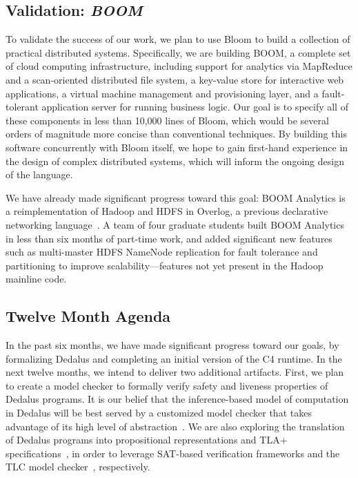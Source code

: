 \subsection{Validation: \emph{BOOM}}
To validate the success of our work, we plan to use Bloom
to build a collection of practical distributed systems. Specifically,
we are building BOOM, a complete set of cloud computing
infrastructure, including support for analytics via MapReduce and a
scan-oriented distributed file system, a key-value store for
interactive web applications, a virtual machine management and
provisioning layer, and a fault-tolerant application server for
running business logic. Our goal is to specify all of these components
in less than 10,000 lines of Bloom, which would be several orders of
magnitude more concise than conventional techniques. By building this
software concurrently with Bloom itself, we hope to gain first-hand
experience in the design of complex distributed systems, which will
inform the ongoing design of the language.

We have already made significant progress toward this goal: BOOM Analytics is a
reimplementation of Hadoop and HDFS in Overlog, a previous declarative
networking language~\cite{boom-eurosys}. A team of four graduate students built
BOOM Analytics in less than six months of part-time work, and added significant
new features such as multi-master HDFS NameNode replication for fault tolerance
and partitioning to improve scalability---features not yet present in the Hadoop
mainline code.


\subsection{Twelve Month Agenda}

In the past six months, we have made significant progress toward our goals, by
formalizing Dedalus and completing an initial version of the C4 runtime. In the
next twelve months, we intend to deliver two additional artifacts. First, we
plan to create a model checker to formally verify safety and liveness properties
of Dedalus programs.  It is our belief that the inference-based model of
computation in Dedalus will be best served by a customized model checker that
takes advantage of its high level of abstraction~\cite{cardan, armc}.  We are
also exploring the translation of Dedalus programs into propositional
representations and TLA+ specifications~\cite{tla}, in order to leverage
SAT-based verification frameworks and the TLC model checker~\cite{tlc},
respectively.

